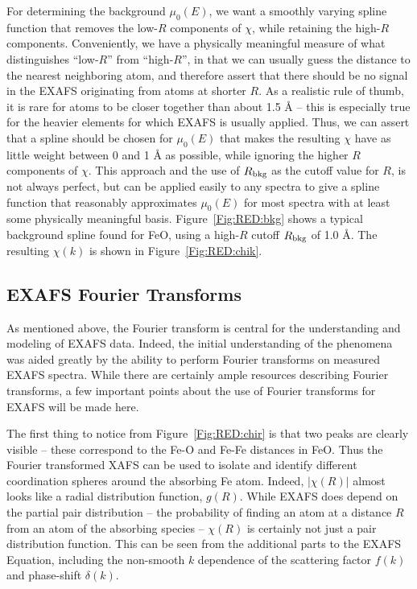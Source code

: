 For determining the background $\mu_0(E)$, we want a smoothly varying
spline function that removes the low-$R$ components of $\chi$, while
retaining the high-$R$ components.  Conveniently, we have a physically
meaningful measure of what distinguishes ``low-$R$'' from ``high-$R$'', in
that we can usually guess the distance to the nearest neighboring atom, and
therefore assert that there should be no signal in the EXAFS originating
from atoms at shorter $R$.  As a realistic rule of thumb, it is rare for
atoms to be closer together than about 1.5 {\AA} -- this is especially true
for the heavier elements for which EXAFS is usually applied.  Thus, we can
assert that a spline should be chosen for $\mu_0(E)$ that makes the
resulting $\chi$ have as little weight between 0 and 1 {\AA} as possible,
while ignoring the higher $R$ components of $\chi$.  This approach and the
use of $R_{\rm bkg}$ as the cutoff value for $R$\cite{autobk}, is not
always perfect, but can be applied easily to any spectra to give a spline
function that reasonably approximates $\mu_0(E)$ for most spectra with at
least some physically meaningful basis.  Figure~\ref{Fig:RED:bkg} shows a
typical background spline found for FeO, using a high-$R$ cutoff $R_{\rm
  bkg}$ of 1.0 {\AA}.  The resulting $\chi(k)$ is shown in
Figure~\ref{Fig:RED:chik}.


\subsection{EXAFS Fourier Transforms}

As mentioned above, the Fourier transform is central for the understanding
and modeling of EXAFS data.  Indeed, the initial understanding of the
phenomena was aided greatly by the ability to perform Fourier transforms on
measured EXAFS spectra.  While there are certainly ample resources
describing Fourier transforms, a few important points about the use of
Fourier transforms for EXAFS will be made here.

The first thing to notice from Figure~\ref{Fig:RED:chir} is that two peaks are
clearly visible -- these correspond to the Fe-O and Fe-Fe distances in
FeO.  Thus the Fourier transformed XAFS can be used to isolate and identify
different coordination spheres around the absorbing Fe atom.  Indeed,
$|\chi(R)|$ almost looks like a radial distribution function, $g(R)$.
While EXAFS does depend on the partial pair distribution -- the probability
of finding an atom at a distance $R$ from an atom of the absorbing species
-- $\chi(R)$ is certainly not just a pair distribution function.  This can
be seen from the additional parts to the EXAFS Equation, including the
non-smooth $k$ dependence of the scattering factor $f(k)$ and phase-shift
$\delta(k)$.

